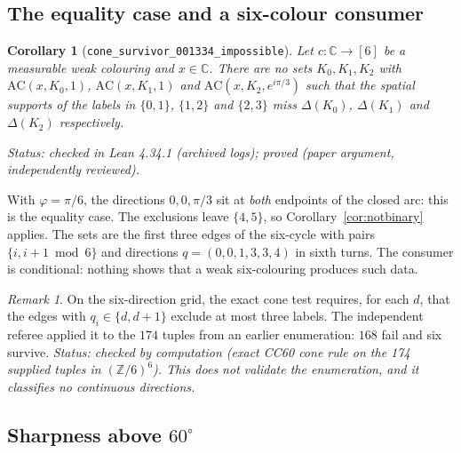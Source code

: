 \documentclass[11pt]{article}
\newtheorem{corollary}[theorem]{Corollary}
\theoremstyle{definition}
\theoremstyle{remark}
\newtheorem{remark}[theorem]{Remark}
\begin{document}
\subsection{The equality case and a six-colour consumer}

\begin{corollary}[\texttt{cone\_\allowbreak{}survivor\_\allowbreak{}001334\_\allowbreak{}impossible}]\label{cor:survivor}
Let $c:\mathbb C\to[6]$ be a measurable weak colouring and $x\in\mathbb C$.
There are no sets $K_0,K_1,K_2$ with $\mathrm{AC}(x,K_0,1)$,
$\mathrm{AC}(x,K_1,1)$ and $\mathrm{AC}(x,K_2,e^{i\pi/3})$ such that the
spatial supports of the labels in $\{0,1\}$, $\{1,2\}$ and $\{2,3\}$ miss
$\Delta(K_0)$, $\Delta(K_1)$ and $\Delta(K_2)$ respectively.
\end{corollary}
\noindent\emph{Status: checked in Lean 4.34.1 (archived logs); proved
(paper argument, independently reviewed).}

With $\varphi=\pi/6$, the directions $0,0,\pi/3$ sit at \emph{both}
endpoints of the closed arc: this is the equality case. The exclusions
leave $\{4,5\}$, so Corollary~\ref{cor:notbinary} applies. The sets are the
first three edges of the six-cycle with pairs $\{i,i+1\bmod6\}$ and
directions $q=(0,0,1,3,3,4)$ in sixth turns. The consumer is conditional:
nothing shows that a weak six-colouring produces such data.

\begin{remark}
On the six-direction grid, the exact cone test requires, for each $d$, that
the edges with $q_i\in\{d,d+1\}$ exclude at most three labels. The
independent referee applied it to the $174$ tuples from an earlier
enumeration: $168$ fail and six survive. \emph{Status: checked by
computation (exact CC60 cone rule on the 174 supplied tuples in
$(\mathbb Z/6)^6$). This does not validate the enumeration, and it
classifies no continuous directions.}
\end{remark}

\subsection{Sharpness above $60^\circ$}
\label{sec:cc60-sharp}
\end{document}

